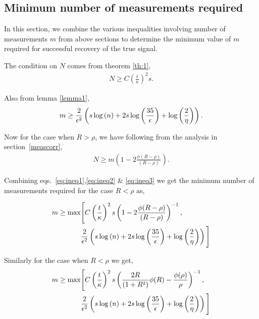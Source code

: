 \subsection{Minimum number of measurements required}
In this section, we combine the various inequalities involving number of measurements $m$ from above sections to determine the minimum value of $m$ required for successful recovery of the true signal.

The condition on $N$ comes from theorem \ref{th:1},
\begin{align}
N \geq C\left(\frac{t}{\kappa}\right)^2s.
\label{eq:ineq1}
\end{align}

Also from lemma \ref{lemma1},
\begin{align}
m \geq \frac{2}{\eps^2}\left(s\log{(n)} + 2s\log{\left(\frac{35}{\eps}\right)}+\log{\left(\frac{2}{\eta}\right)}\right).
\label{eq:ineq2}
\end{align}

Now for the case when $R> \rho$, we have following from the analysis in section~\ref{meascorr},
\begin{align}
N \geq m \left(1-2\frac{\phi(R-\rho)}{(R-\rho)} \right).
\label{eq:ineq3}
\end{align}

Combining eqs.~\ref{eq:ineq1},\ref{eq:ineq2} \& \ref{eq:ineq3} we get the minimum number of measurements required for the case $R < \rho$ as,

\begin{align}
m \geq \max & \Bigg[ C\left(\frac{t}{\kappa}\right)^2s \left(1-2\frac{\phi(R-\rho)}{(R-\rho)} \right)^{-1}, \nonumber \\ 
& \frac{2}{\eps^2}\left(s\log{(n)} + 2s\log{\left(\frac{35}{\eps}\right)}+\log{\left(\frac{2}{\eta}\right)}\right)\Bigg]
\label{eq:ineq4}
\end{align}

Similarly for the case when $R<\rho$ we get,
\begin{align}
m \geq \max &  \Bigg[C\left(\frac{t}{\kappa}\right)^2s \left(\frac{2R}{(1+R^2)} \phi(R) - \frac{\phi(\rho)}{\rho}\right)^{-1}, \nonumber \\ 
& \frac{2}{\eps^2}\left(s\log{(n)} + 2s\log{\left(\frac{35}{\eps}\right)}+\log{\left(\frac{2}{\eta}\right)}\right) \Bigg]
\label{eq:ineq5}
\end{align}